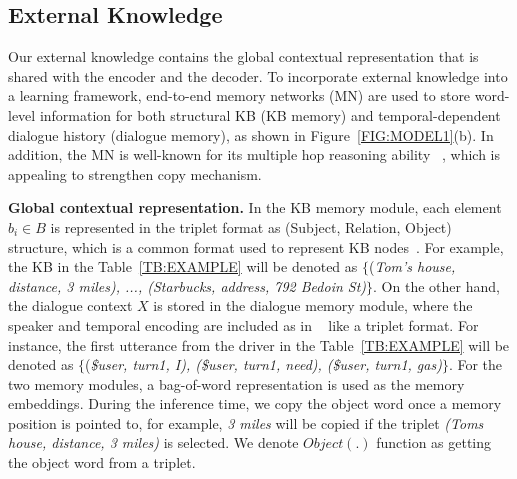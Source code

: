 \documentclass{article} \usepackage{iclr2019_conference,times}
\begin{document}
\subsection{External Knowledge}
Our external knowledge contains the global contextual representation that is shared with the encoder and the decoder. To incorporate external knowledge into a learning framework, end-to-end memory networks (MN) are used to store word-level information for both structural KB (KB memory) and temporal-dependent dialogue history (dialogue memory), as shown in Figure~\ref{FIG:MODEL1}(b). In addition, the MN is well-known for its multiple hop reasoning ability ~\citep{sukhbaatar2015end}, which is appealing to strengthen copy mechanism. 

\textbf{Global contextual representation.} In the KB memory module, each element $b_i \in B$ is represented in the triplet format as (Subject, Relation, Object) structure, which is a common format used to represent KB nodes~\citep{millerEtAl2016,ericKVR2017}. For example, the KB in the Table~\ref{TB:EXAMPLE} will be denoted as $\{$(\textit{Tom's house, distance, 3 miles), ..., (Starbucks, address, 792 Bedoin St)}$\}$. On the other hand, the dialogue context $X$ is stored in the dialogue memory module, where the speaker and temporal encoding are included as in ~\cite{bordes2016learning} like a triplet format. For instance, the first utterance from the driver in the Table~\ref{TB:EXAMPLE} will be denoted as $\{$(\textit{\$user, turn1, I), (\$user, turn1, need), (\$user, turn1, gas)}$\}$. For the two memory modules, a bag-of-word representation is used as the memory embeddings. During the inference time, we copy the object word once a memory position is pointed to, for example, \textit{3 miles} will be copied if the triplet \textit{(Toms house, distance, 3 miles)} is selected. We denote $Object(.)$ function as getting the object word from a triplet.
\end{document}
